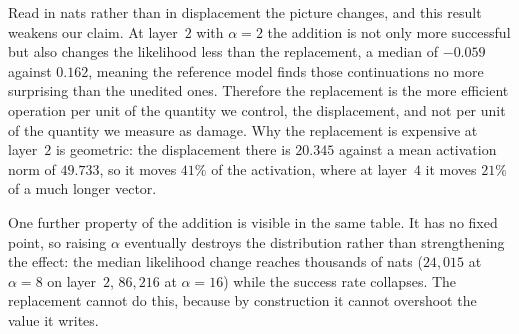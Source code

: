 \documentclass{article}
\begin{document}
Read in nats rather than in displacement the picture changes, and this result weakens
our claim. At layer~$2$ with $\alpha=2$ the addition is not only more successful but also
changes the likelihood less than the replacement, a median of $-0.059$ against $0.162$,
meaning the reference model finds those continuations no more surprising than the
unedited ones. Therefore the
replacement is the more efficient operation per unit of the quantity we control, the
displacement, and not per unit of the quantity we measure as damage. Why the replacement
is expensive at layer~$2$ is geometric: the displacement there is $20.345$ against a mean
activation norm of $49.733$, so it moves $41\%$ of the activation, where at layer~$4$ it
moves $21\%$ of a much longer vector.

One further property of the addition is visible in the same table. It has no fixed
point, so raising $\alpha$ eventually destroys the distribution rather than
strengthening the effect: the median likelihood change reaches thousands of nats
($24{,}015$ at $\alpha=8$ on layer~$2$, $86{,}216$ at $\alpha=16$) while the success rate
collapses. The replacement cannot do this, because by construction it cannot overshoot the
value it writes.
\end{document}
